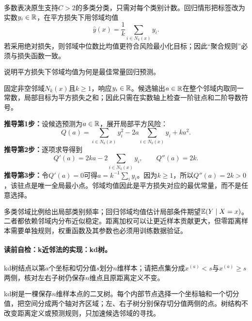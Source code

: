 多数表决原生支持$C>2$的多类分类，只需对每个类别计数。回归情形把标签改为实数$y_i\in\mathbb{R}$，在平方损失下用邻域均值
\[
\widehat y(x)=\frac1k\sum_{i\in N_k(x)}y_i.
\]
若采用绝对损失，则邻域中位数比均值更符合风险最小化目标；因此“聚合规则”必须与损失函数一致。


\begin{derivationgoalbox}
说明平方损失下邻域均值为何是最佳常量回归预测。
\end{derivationgoalbox}
\begin{derivationprepbox}
固定非空邻域$N_k(x)$且$k\ge1$，响应$y_i\in\mathbb{R}$。候选输出$a\in\mathbb{R}$在整个邻域内取同一常数，局部目标为平方损失之和；因此只需在实数轴上检查一阶驻点和二阶导数符号。
\end{derivationprepbox}
\textbf{推导第1步：}设候选预测为$a\in\mathbb{R}$，展开局部平方风险：
\[
Q(a)=\sum_{i\in N_k(x)}y_i^2-2a\sum_{i\in N_k(x)}y_i+ka^2.
\]
\textbf{推导第2步：}逐项求导得到
\[
Q'(a)=2ka-2\sum_{i\in N_k(x)}y_i,\qquad Q''(a)=2k.
\]
\textbf{推导第3步：}令$Q'(a)=0$可得$a=k^{-1}\sum_i y_i$。因为$k\ge1$，所以$Q''(a)=2k>0$，该驻点是唯一全局最小点。邻域均值因此是平方损失对应的最优常量，而不是任意选择。

\begin{probabilitybox}
多类邻域比例给出局部类别频率；回归邻域均值估计局部条件期望$\mathbb{E}(Y\mid X=x)$。二者都依赖邻域内分布近似稳定。距离加权可以让更近样本贡献更大，但零距离样本需要单独规则，权重函数及其参数也必须用训练数据验证。
\end{probabilitybox}


\paragraph{读前自检：k近邻法的实现：kd树。}kd树结点以第$a$个坐标和切分值$s$划分$n$维样本；请把点集分成$x^{(a)}<s$与$x^{(a)}\ge s$两侧，核对左右子树仍保存$n$维点且原距离定义不变。\par

kd树是一棵保存$n$维样本点的二叉树。每个内部节点选择一个坐标轴和一个切分值，把空间分成两个轴对齐区域；左、右子树分别保存切分值两侧的点。树结构不改变距离定义或预测规则，只加速候选邻域的寻找。

